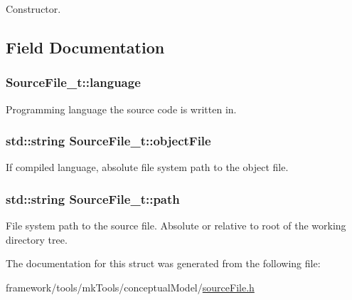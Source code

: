 Constructor. 



\subsection{Field Documentation}
\subsubsection[{\texorpdfstring{language}{language}}]{ Source\+File\+\_\+t\+::language}\hypertarget{struct_source_file__t_ad36dfc2f22234d98275656c3fff869dc}{}\label{struct_source_file__t_ad36dfc2f22234d98275656c3fff869dc}


Programming language the source code is written in. 

\subsubsection[{\texorpdfstring{object\+File}{objectFile}}]{\setlength{\rightskip}{0pt plus 5cm}std\+::string Source\+File\+\_\+t\+::object\+File}\hypertarget{struct_source_file__t_a59cc3408a13add0c1b5a7ae0975d8349}{}\label{struct_source_file__t_a59cc3408a13add0c1b5a7ae0975d8349}


If compiled language, absolute file system path to the object file. 

\subsubsection[{\texorpdfstring{path}{path}}]{\setlength{\rightskip}{0pt plus 5cm}std\+::string Source\+File\+\_\+t\+::path}\hypertarget{struct_source_file__t_ac64a9ed3b47d489c93825f70928bab57}{}\label{struct_source_file__t_ac64a9ed3b47d489c93825f70928bab57}
File system path to the source file. Absolute or relative to root of the working directory tree. 

The documentation for this struct was generated from the following file\+:\begin{DoxyCompactItemize}
\item 
framework/tools/mk\+Tools/conceptual\+Model/\hyperlink{source_file_8h}{source\+File.\+h}\end{DoxyCompactItemize}
